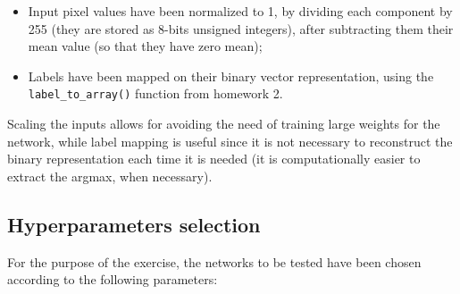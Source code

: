 \documentclass[letterpaper,headings=standardclasses]{scrartcl}
\begin{document}
\begin{itemize}

    \item Input pixel values have been normalized to 1, by dividing each component by 255 (they are stored as 8-bits unsigned integers), after subtracting them their mean value (so that they have zero mean);
    
    \item Labels have been mapped on their binary vector representation, using the \texttt{label\_to\_array()} function from homework 2.

\end{itemize}

Scaling the inputs allows for avoiding the need of training large weights for the network, while label mapping is useful since it is not necessary to reconstruct the binary representation each time it is needed (it is computationally easier to extract the argmax, when necessary).

\subsection{Hyperparameters selection}

For the purpose of the exercise, the networks to be tested have been chosen according to the following parameters:
\end{document}
